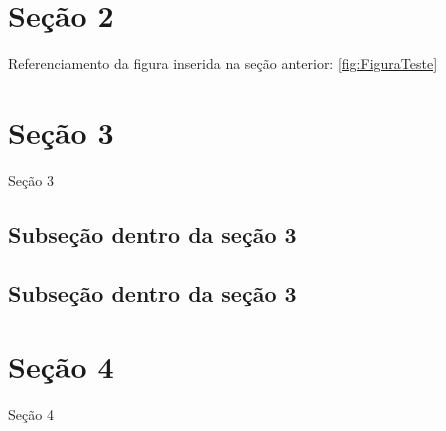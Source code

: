 \section{Seção 2}

Referenciamento da figura inserida na seção anterior: \ref{fig:FiguraTeste}


\section{Seção 3}

Seção 3
\subsection{Subseção dentro da seção 3}
\subsection{Subseção dentro da seção 3}


\section{Seção 4}

Seção 4